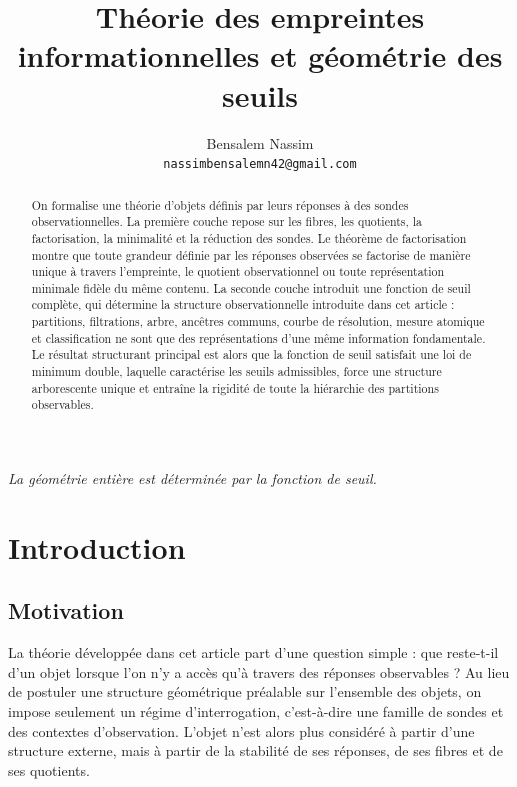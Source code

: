 \documentclass[11pt,a4paper]{article}
\title{Théorie des empreintes informationnelles et géométrie des seuils}
\author{Bensalem Nassim\\\texttt{nassimbensalemn42@gmail.com}}
\date{}
\begin{document}
\maketitle

\begin{center}
\emph{La géométrie entière est déterminée par la fonction de seuil.}
\end{center}

\begin{abstract}
On formalise une théorie d'objets définis par leurs réponses à des sondes observationnelles. La première couche repose sur les fibres, les quotients, la factorisation, la minimalité et la réduction des sondes. Le théorème de factorisation montre que toute grandeur définie par les réponses observées se factorise de manière unique à travers l'empreinte, le quotient observationnel ou toute représentation minimale fidèle du même contenu. La seconde couche introduit une fonction de seuil complète, qui détermine la structure observationnelle introduite dans cet article : partitions, filtrations, arbre, ancêtres communs, courbe de résolution, mesure atomique et classification ne sont que des représentations d'une même information fondamentale. Le résultat structurant principal est alors que la fonction de seuil satisfait une loi de minimum double, laquelle caractérise les seuils admissibles, force une structure arborescente unique et entraîne la rigidité de toute la hiérarchie des partitions observables.
\end{abstract}

\clearpage
\tableofcontents
\clearpage

\section{Introduction}

\subsection{Motivation}

La théorie développée dans cet article part d'une question simple : que reste-t-il d'un objet lorsque l'on n'y a accès qu'à travers des réponses observables ? Au lieu de postuler une structure géométrique préalable sur l'ensemble des objets, on impose seulement un régime d'interrogation, c'est-à-dire une famille de sondes et des contextes d'observation. L'objet n'est alors plus considéré à partir d'une structure externe, mais à partir de la stabilité de ses réponses, de ses fibres et de ses quotients.
\end{document}
